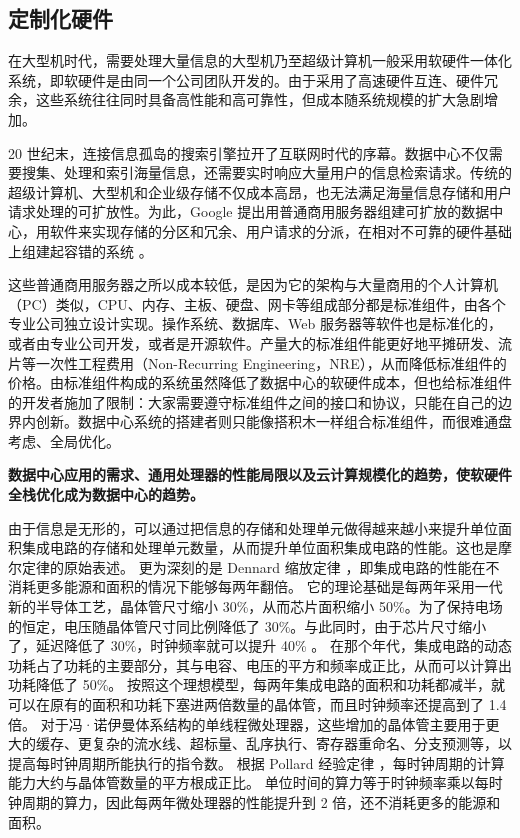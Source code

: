 \subsection{定制化硬件}
\label{background:sec:datacenter-customized}


在大型机时代，需要处理大量信息的大型机乃至超级计算机一般采用软硬件一体化系统，即软硬件是由同一个公司团队开发的。由于采用了高速硬件互连、硬件冗余，这些系统往往同时具备高性能和高可靠性，但成本随系统规模的扩大急剧增加。

20 世纪末，连接信息孤岛的搜索引擎拉开了互联网时代的序幕。数据中心不仅需要搜集、处理和索引海量信息，还需要实时响应大量用户的信息检索请求。传统的超级计算机、大型机和企业级存储不仅成本高昂，也无法满足海量信息存储和用户请求处理的可扩放性。为此，Google 提出用普通商用服务器组建可扩放的数据中心，用软件来实现存储的分区和冗余、用户请求的分派，在相对不可靠的硬件基础上组建起容错的系统 \cite{dean2008mapreduce}。

这些普通商用服务器之所以成本较低，是因为它的架构与大量商用的个人计算机（PC）类似，CPU、内存、主板、硬盘、网卡等组成部分都是标准组件，由各个专业公司独立设计实现。操作系统、数据库、Web 服务器等软件也是标准化的，或者由专业公司开发，或者是开源软件。产量大的标准组件能更好地平摊研发、流片等一次性工程费用（Non-Recurring Engineering，NRE），从而降低标准组件的价格。由标准组件构成的系统虽然降低了数据中心的软硬件成本，但也给标准组件的开发者施加了限制：大家需要遵守标准组件之间的接口和协议，只能在自己的边界内创新。数据中心系统的搭建者则只能像搭积木一样组合标准组件，而很难通盘考虑、全局优化。

\textbf{数据中心应用的需求、通用处理器的性能局限以及云计算规模化的趋势，使软硬件全栈优化成为数据中心的趋势。}

由于信息是无形的，可以通过把信息的存储和处理单元做得越来越小来提升单位面积集成电路的存储和处理单元数量，从而提升单位面积集成电路的性能。这也是摩尔定律的原始表述。
更为深刻的是 Dennard 缩放定律 \cite{dennard1974design}，即集成电路的性能在不消耗更多能源和面积的情况下能够每两年翻倍。
它的理论基础是每两年采用一代新的半导体工艺，晶体管尺寸缩小 30\%，从而芯片面积缩小 50\%。为了保持电场的恒定，电压随晶体管尺寸同比例降低了 30\%。与此同时，由于芯片尺寸缩小了，延迟降低了 30\%，时钟频率就可以提升 40\% \cite{borkar1999design,borkar2011future}。
在那个年代，集成电路的动态功耗占了功耗的主要部分，其与电容、电压的平方和频率成正比，从而可以计算出功耗降低了 50\%。
按照这个理想模型，每两年集成电路的面积和功耗都减半，就可以在原有的面积和功耗下塞进两倍数量的晶体管，而且时钟频率还提高到了 1.4 倍。
对于冯·诺伊曼体系结构的单线程微处理器，这些增加的晶体管主要用于更大的缓存、更复杂的流水线、超标量、乱序执行、寄存器重命名、分支预测等，以提高每时钟周期所能执行的指令数。
根据 Pollard 经验定律 \cite{pollackpollack}，每时钟周期的计算能力大约与晶体管数量的平方根成正比。
单位时间的算力等于时钟频率乘以每时钟周期的算力，因此每两年微处理器的性能提升到 2 倍，还不消耗更多的能源和面积。

